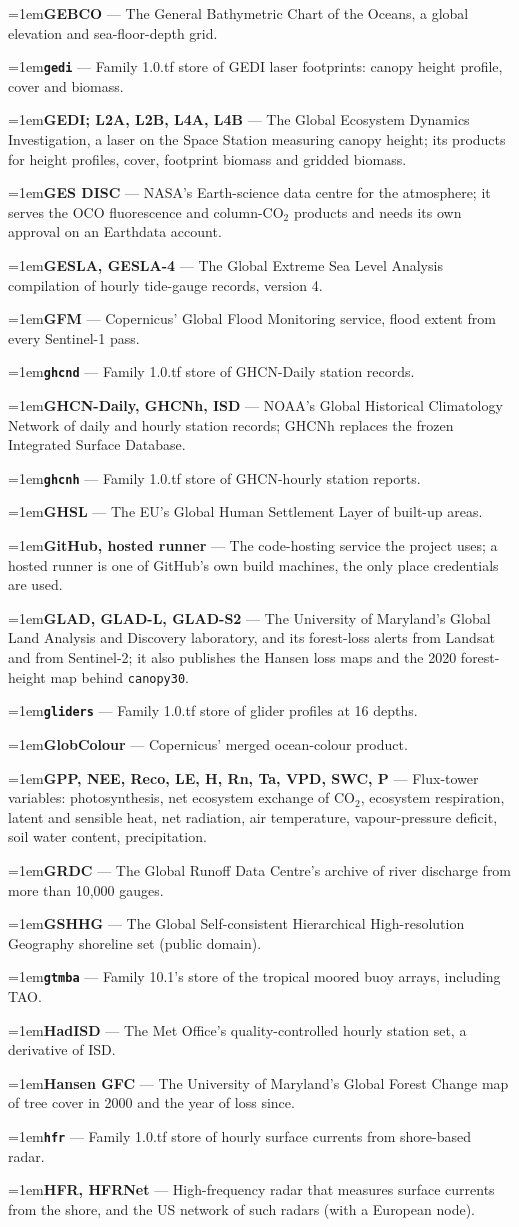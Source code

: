 \documentclass[10pt]{article}
\newcommand{\code}[1]{\texttt{#1}}
\newcommand{\gl}[2]{\par\hangindent=1em\hangafter=1\textbf{#1} --- #2\par}
\begin{document}
\gl{GEBCO}{The General Bathymetric Chart of the Oceans, a global elevation and sea-floor-depth grid.}
\gl{\code{gedi}}{Family 1.0.tf store of GEDI laser footprints: canopy height profile, cover and biomass.}
\gl{GEDI; L2A, L2B, L4A, L4B}{The Global Ecosystem Dynamics Investigation, a laser on the Space Station measuring canopy height; its products for height profiles, cover, footprint biomass and gridded biomass.}
\gl{GES DISC}{NASA's Earth-science data centre for the atmosphere; it serves the OCO fluorescence and column-CO$_2$ products and needs its own approval on an Earthdata account.}
\gl{GESLA, GESLA-4}{The Global Extreme Sea Level Analysis compilation of hourly tide-gauge records, version 4.}
\gl{GFM}{Copernicus' Global Flood Monitoring service, flood extent from every Sentinel-1 pass.}
\gl{\code{ghcnd}}{Family 1.0.tf store of GHCN-Daily station records.}
\gl{GHCN-Daily, GHCNh, ISD}{NOAA's Global Historical Climatology Network of daily and hourly station records; GHCNh replaces the frozen Integrated Surface Database.}
\gl{\code{ghcnh}}{Family 1.0.tf store of GHCN-hourly station reports.}
\gl{GHSL}{The EU's Global Human Settlement Layer of built-up areas.}
\gl{GitHub, hosted runner}{The code-hosting service the project uses; a hosted runner is one of GitHub's own build machines, the only place credentials are used.}
\gl{GLAD, GLAD-L, GLAD-S2}{The University of Maryland's Global Land Analysis and Discovery laboratory, and its forest-loss alerts from Landsat and from Sentinel-2; it also publishes the Hansen loss maps and the 2020 forest-height map behind \code{canopy30}.}
\gl{\code{gliders}}{Family 1.0.tf store of glider profiles at 16 depths.}
\gl{GlobColour}{Copernicus' merged ocean-colour product.}
\gl{GPP, NEE, Reco, LE, H, Rn, Ta, VPD, SWC, P}{Flux-tower variables: photosynthesis, net ecosystem exchange of CO$_2$, ecosystem respiration, latent and sensible heat, net radiation, air temperature, vapour-pressure deficit, soil water content, precipitation.}
\gl{GRDC}{The Global Runoff Data Centre's archive of river discharge from more than 10,000 gauges.}
\gl{GSHHG}{The Global Self-consistent Hierarchical High-resolution Geography shoreline set (public domain).}
\gl{\code{gtmba}}{Family 10.1's store of the tropical moored buoy arrays, including TAO.}
\gl{HadISD}{The Met Office's quality-controlled hourly station set, a derivative of ISD.}
\gl{Hansen GFC}{The University of Maryland's Global Forest Change map of tree cover in 2000 and the year of loss since.}
\gl{\code{hfr}}{Family 1.0.tf store of hourly surface currents from shore-based radar.}
\gl{HFR, HFRNet}{High-frequency radar that measures surface currents from the shore, and the US network of such radars (with a European node).}
\end{document}

